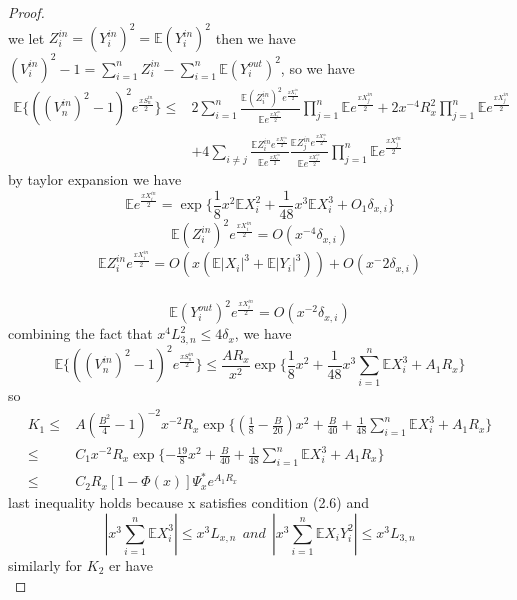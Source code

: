 \documentclass[bj,authoryear]{imsart}
\numberwithin{equation}{section}
\theoremstyle{plain}
\theoremstyle{definition}
\begin{document}
\begin{proof}
\begin{equation}
  \end{equation}
  we let $Z_{i}^{in} = (Y_{i}^{in})^2=\mathbb{E} (Y_{i}^{in})^2$ then we have $(V_{i}^{in})^2-1 = \sum_{i=1}^{n}Z_{i}^{in}-\sum_{i=1}^{n}\mathbb{E} (Y_{i}^{out})^2$, so we have
  \begin{equation}
    \begin{aligned}
      \mathbb{E} \{((V_n^{in})^2-1)^2e^{\frac{xS_n^{in}}{2}}\}\leq& 2\sum_{i=1}^{n}\frac{\mathbb{E} (Z_i^{in})^2e^{\frac{xX_{i}^{in}}{2}}}{\mathbb{E} e^{\frac{xX_{i}^{in}}{2}}}\prod_{j = 1}^{n}\mathbb{E} e^{\frac{xX_{j}^{in}}{2}}+2x^{-4}R_x^2\prod_{j = 1}^{n}\mathbb{E} e^{\frac{xX_{j}^{in}}{2}}\\
      &+4\sum_{i\neq j}\frac{\mathbb{E} Z_i^{in}e^{\frac{xX_{i}^{in}}{2}}}{\mathbb{E} e^{\frac{xX_{i}^{in}}{2}}}\frac{\mathbb{E} Z_j^{in}e^{\frac{xX_{j}^{in}}{2}}}{\mathbb{E} e^{\frac{xX_{j}^{in}}{2}}}\prod_{j=1}^{n}\mathbb{E} e^{\frac{xX_{j}^{in}}{2}}
    \end{aligned}
  \end{equation}
  by taylor expansion we have
  $$\mathbb{E} e^{\frac{xX_i^{in}}{2}} = \exp\{\frac{1}{8}x^2\mathbb{E} X_i^2+\frac{1}{48}x^3\mathbb{E} X_i^3+O_1\delta_{x,i}\}$$
  $$\mathbb{E} (Z_i^{in})^2e^{\frac{xX_{i}^{in}}{2}} = O(x^{-4}\delta_{x,i})$$
  $$\mathbb{E} Z_i^{in}e^{\frac{xX_{i}^{in}}{2}} = O(x(\mathbb{E} |X_i|^3+\mathbb{E} |Y_i|^3))+O(x^-2\delta_{x,i})$$\
  $$\mathbb{E} (Y_i^{out})^2e^{\frac{xX_{i}^{in}}{2}} = O(x^{-2}\delta_{x,i})$$
  combining the fact that $x^4L_{3,n}^{2}\leq 4\delta_{x}$, we have
  $$\mathbb{E} \{((V_n^{in})^2-1)^2e^{\frac{xS_n^{in}}{2}}\}\leq \frac{AR_x}{x^2}\exp\{\frac{1}{8}x^2+\frac{1}{48}x^3\sum_{i=1}^{n}\mathbb{E} X_i^3+ A_1R_x\}$$
  so
  \begin{equation}
    \begin{aligned}
      K_1\leq& A(\frac{B^2}{4}-1)^{-2}x^{-2}R_x\exp\{(\frac{1}{8}-\frac{B}{20})x^2+\frac{B}{40}+\frac{1}{48}\sum_{i=1}^{n}\mathbb{E} X_i^3+A_1R_x\}\\
      \leq &C_1x^{-2}R_x\exp\{-\frac{19}{8}x^2+\frac{B}{40}+\frac{1}{48}\sum_{i=1}^{n}\mathbb{E} X_i^3+A_1R_x\}\\
      \leq &C_2R_x[1-\Phi(x)]\Psi_{x}^{*}e^{A_1R_x}
    \end{aligned}
  \end{equation}
  last inequality holds because x satisfies condition (2.6) and $$|x^3\sum_{i=1}^{n}\mathbb{E} X_i^3|\leq x^3 L_{x,n} \ \ and\ \  |x^3\sum_{i=1}^{n}\mathbb{E} X_iY_i^2|\leq x^3L_{3,n}$$
  similarly for $K_2$ er have
  \begin{equation}

\end{equation}
\end{proof}
\end{document}
